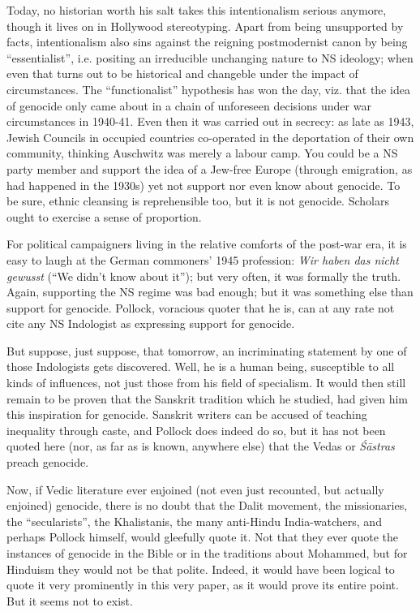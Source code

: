 Today, no historian worth his salt takes this intentionalism serious anymore, though it lives on in Hollywood stereotyping. Apart from being unsupported by facts, intentionalism also sins against the reigning postmodernist canon by being “essentialist”, i.e. positing an irreducible unchanging nature to NS ideology; when even that turns out to be historical and changeble under the impact of circumstances. The “functionalist” hypothesis has won the day, viz. that the idea of genocide only came about in a chain of unforeseen decisions under war circumstances in 1940-41. Even then it was carried out in secrecy: as late as 1943, Jewish Councils in occupied countries co-operated in the deportation of their own community, thinking Auschwitz was merely a labour camp. You could be a NS party member and support the idea of a Jew-free Europe (through emigration, as had happened in the 1930s) yet not support nor even know about genocide. To be sure, ethnic cleansing is reprehensible too, but it is not genocide. Scholars ought to exercise a sense of proportion.

For political campaigners living in the relative comforts of the post-war era, it is easy to laugh at the German commoners’ 1945 profession: {\sl Wir haben das nicht gewusst} (“We didn’t know about it”); but very often, it was formally the truth. Again, supporting the NS regime was bad enough; but it was something else than support for genocide. Pollock, voracious quoter that he is, can at any rate not cite any NS Indologist as expressing support for genocide.

But suppose, just suppose, that tomorrow, an incriminating statement by one of those Indologists gets discovered. Well, he is a human being, susceptible to all kinds of influences, not just those from his field of specialism. It would then still remain to be proven that the Sanskrit tradition which he studied, had given him this inspiration for genocide. Sanskrit writers can be accused of teaching inequality through caste, and Pollock does indeed do so, but it has not been quoted here (nor, as far as is known, anywhere else) that the Vedas or {\sl Śāstras} preach genocide.

Now, if Vedic literature ever enjoined (not even just recounted, but actually enjoined) genocide, there is no doubt that the Dalit movement, the missionaries, the “secularists”, the Khalistanis, the many anti-Hindu India-watchers, and perhaps Pollock himself, would gleefully quote it. Not that they ever quote the instances of genocide in the Bible or in the traditions about Mohammed, but for Hinduism they would not be that polite. Indeed, it would have been logical to quote it very prominently in this very paper, as it would prove its entire point. But it seems not to exist.

